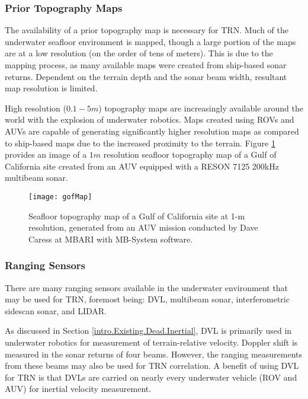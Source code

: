 \subsubsection{Prior Topography Maps}
\label{intro.Existing.Terrain.Prior}

The availability of a prior topography map is necessary for TRN. Much of the underwater seafloor environment is mapped, though a large portion of the maps are at a low resolution (on the order of tens of meters). This is due to the mapping process, as many available maps were created from ship-based sonar returns.  Dependent on the terrain depth and the sonar beam width, resultant map resolution is limited.

High resolution ($0.1-5m$) topography maps are increasingly available around the world with the explosion of underwater robotics.  
Maps created using ROVs and AUVs are capable of generating significantly higher resolution maps as compared to ship-based maps due to the increased proximity to the terrain.  
Figure \ref{fig:gofMap} provides an image of a $1m$ resolution seafloor topography map of a Gulf of California site created from an AUV equipped with a RESON 7125 200kHz multibeam sonar.

\begin{figure}[!h!]
	\centering
		\texttt{[image: gofMap]}
	\caption{Seafloor topography map of a Gulf of California site at 1-m resolution, generated from an AUV mission conducted by Dave Caress at MBARI with MB-System software.}
	\label{fig:gofMap}
\end{figure}

\subsubsection{Ranging Sensors}
\label{intro.Existing.Terrain.Ranging}

There are many ranging sensors available in the underwater environment that may be used for TRN, foremost being: DVL, multibeam sonar, interferometric sidescan sonar, and LIDAR.

As discussed in Section \ref{intro.Existing.Dead.Inertial}, DVL is primarily used in underwater robotics for measurement of terrain-relative velocity.  Doppler shift is measured in the sonar returns of four beams.  However, the ranging measurements from these beams may also be used for TRN correlation. A benefit of using DVL for TRN is that DVLs are carried on nearly every underwater vehicle (ROV and AUV) for inertial velocity measurement.

